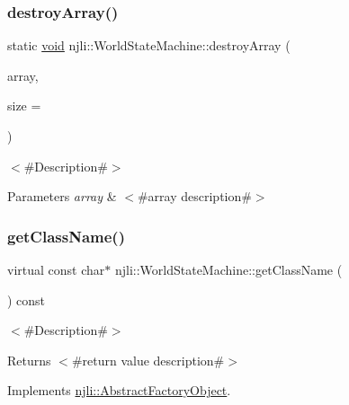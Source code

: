 \subsubsection{\texorpdfstring{destroy\+Array()}{destroyArray()}}
{\footnotesize\ttfamily static \mbox{\hyperlink{_thread_8h_af1e856da2e658414cb2456cb6f7ebc66}{void}} njli\+::\+World\+State\+Machine\+::destroy\+Array (\begin{DoxyParamCaption}\item[{\mbox{\hyperlink{classnjli_1_1_world_state_machine}{World\+State\+Machine}} $\ast$$\ast$}]{array,  }\item[{const \mbox{\hyperlink{_util_8h_a10e94b422ef0c20dcdec20d31a1f5049}{u32}}}]{size = {} }\end{DoxyParamCaption})\hspace{0.3cm}{\ttfamily [static]}}

$<$\#\+Description\#$>$


\begin{DoxyParams}{Parameters}
{\em array} & $<$\#array description\#$>$ \\
\hline
\end{DoxyParams}
\mbox{\label{classnjli_1_1_world_state_machine_a4a0b8431c122f5cb325b3f4e1d4a10cb}} 
\subsubsection{\texorpdfstring{get\+Class\+Name()}{getClassName()}}
{\footnotesize\ttfamily virtual const char$\ast$ njli\+::\+World\+State\+Machine\+::get\+Class\+Name (\begin{DoxyParamCaption}{ }\end{DoxyParamCaption}) const\hspace{0.3cm}{\ttfamily [virtual]}}

$<$\#\+Description\#$>$

\begin{DoxyReturn}{Returns}
$<$\#return value description\#$>$ 
\end{DoxyReturn}


Implements \mbox{\hyperlink{classnjli_1_1_abstract_factory_object_af4151e41b80d5bc3fc42822c67fc2278}{njli\+::\+Abstract\+Factory\+Object}}.

